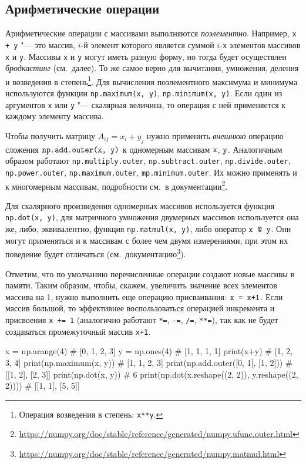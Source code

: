 \subsection{Арифметические операции}
Арифметические операции  с массивами выполняются \emph{поэлементно}.
Например, \verb"x + y" "--- это массив, $i$-й элемент которого является суммой $i$-х элементов массивов \verb"x" и \verb"y". Массивы \verb"x" и \verb"y" могут иметь разную форму, но тогда будет осуществлен \emph{бродкастинг} (см.~далее).
То же самое верно для вычитания, умножения, деления и возведения в степень\footnote{Операция возведения в степень: \verb"x**y".}.
Для вычисления поэлементного максимума и минимума используются функции \verb"np.maximum(x, y)", \verb"np.minimum(x, y)".
Если один из аргументов \verb"x" или \verb"y" "--- скалярная величина, то операция с ней применяется к каждому элементу массива.

Чтобы получить матрицу $A_{ij} = x_i+y_j$ нужно применить \emph{внешнюю} операцию сложения $\verb"np.add.outer(x, y)"$ к одномерным массивам $\verb"x"$, $\verb"y"$.
Аналогичным образом работают \verb"np.multiply.outer", \verb"np.subtract.outer", \verb"np.divide.outer", \verb"np.power.outer", \verb"np.maximum.outer", \verb"mp.minimum.outer".
Их можно применять и к многомерным массивам, подробности см.~в документации\footnote{\url{https://numpy.org/doc/stable/reference/generated/numpy.ufunc.outer.html}}. 

Для скалярного произведения одномерных массивов используется функция \verb"np.dot(x, y)", для матричного умножения двумерных массивов используется она же, либо, эквивалентно, функция \verb"np.matmul(x, y)", либо оператор $\verb"x @ y"$.
Они могут применяться и к массивам с более чем двумя измерениями, при этом их поведение будет отличаться (см.~документацию\footnote{\url{https://numpy.org/doc/stable/reference/generated/numpy.matmul.html}}).

Отметим, что по умолчанию перечисленные операции создают новые массивы в памяти.
Таким образом, чтобы, скажем, увеличить значение всех элементов массива на 1, нужно выполнить еще операцию присваивания: $\verb"x = x+1"$.
Если массив большой, то эффективнее воспользоваться операцией инкремента и присвоения \verb"x += 1" (аналогично работают \verb"*=", \verb"-=", \verb"/=", \verb"**="), так как не будет создаваться промежуточный массив \verb"x+1".
\begin{python}
x = np.arange(4)                                     # [0, 1, 2, 3]
y = np.ones(4)                                       # [1, 1, 1, 1]
print(x+y)                                           # [1, 2, 3, 4]
print(np.maximum(x, y))                              # [1, 1, 2, 3]
print(np.add.outer([0, 1], [1, 2]))                  # [[1, 2], [2, 3]]
print(np.dot(x, y))                                  # 6
print(np.dot(x.reshape((2, 2)), y.reshape((2, 2))))  # [[1, 1], [5, 5]]
\end{python}


